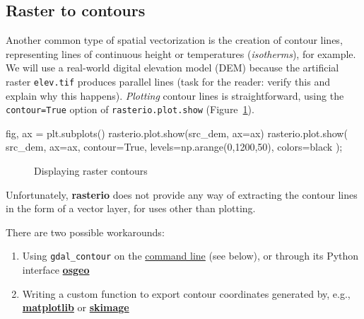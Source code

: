 \documentclass[
  letterpaper,
]{krantz}
\newenvironment{Shaded}{\begin{snugshade}}{\end{snugshade}}
\newcommand{\DecValTok}[1]{\textcolor[rgb]{0.68,0.00,0.00}{#1}}
\newcommand{\NormalTok}[1]{\textcolor[rgb]{0.00,0.23,0.31}{#1}}
\newcommand{\OperatorTok}[1]{\textcolor[rgb]{0.37,0.37,0.37}{#1}}
\newcommand{\StringTok}[1]{\textcolor[rgb]{0.13,0.47,0.30}{#1}}
\newcommand{\VariableTok}[1]{\textcolor[rgb]{0.07,0.07,0.07}{#1}}
\providecommand{\tightlist}{%
  \setlength{\itemsep}{0pt}\setlength{\parskip}{0pt}}\usepackage{longtable,booktabs,array}
\begin{document}
\subsection{Raster to contours}\label{sec-raster-to-contours}

Another common type of spatial vectorization is the creation of contour
lines, representing lines of continuous height or temperatures
(\emph{isotherms}), for example. We will use a real-world digital
elevation model (DEM) because the artificial raster \texttt{elev.tif}
produces parallel lines (task for the reader: verify this and explain
why this happens). \emph{Plotting} contour lines is straightforward,
using the \texttt{contour=True} option of \texttt{rasterio.plot.show}
(Figure~\ref{fig-raster-contours1}).

\begin{Shaded}
\begin{Highlighting}[]
\NormalTok{fig, ax }\OperatorTok{=}\NormalTok{ plt.subplots()}
\NormalTok{rasterio.plot.show(src\_dem, ax}\OperatorTok{=}\NormalTok{ax)}
\NormalTok{rasterio.plot.show(}
\NormalTok{    src\_dem, }
\NormalTok{    ax}\OperatorTok{=}\NormalTok{ax, }
\NormalTok{    contour}\OperatorTok{=}\VariableTok{True}\NormalTok{, }
\NormalTok{    levels}\OperatorTok{=}\NormalTok{np.arange(}\DecValTok{0}\NormalTok{,}\DecValTok{1200}\NormalTok{,}\DecValTok{50}\NormalTok{), }
\NormalTok{    colors}\OperatorTok{=}\StringTok{\textquotesingle{}black\textquotesingle{}}
\NormalTok{)}\OperatorTok{;}
\end{Highlighting}
\end{Shaded}

\begin{figure}[H]


\caption{\label{fig-raster-contours1}Displaying raster contours}

\end{figure}%

Unfortunately, \textbf{rasterio} does not provide any way of extracting
the contour lines in the form of a vector layer, for uses other than
plotting.

There are two possible workarounds:

\begin{enumerate}
\def\labelenumi{\arabic{enumi}.}
\tightlist
\item
  Using \texttt{gdal\_contour} on the
  \href{https://gdal.org/programs/gdal_contour.html}{command line} (see
  below), or through its Python interface
  \href{https://gis.stackexchange.com/questions/360431/how-can-i-create-contours-from-geotiff-and-python-gdal-rasterio-etc-into-sh}{\textbf{osgeo}}
\item
  Writing a custom function to export contour coordinates generated by,
  e.g.,
  \href{https://www.tutorialspoint.com/how-to-get-coordinates-from-the-contour-in-matplotlib}{\textbf{matplotlib}}
  or
  \href{https://gis.stackexchange.com/questions/268331/how-can-i-extract-contours-from-a-raster-with-python}{\textbf{skimage}}
\end{enumerate}
\end{document}
